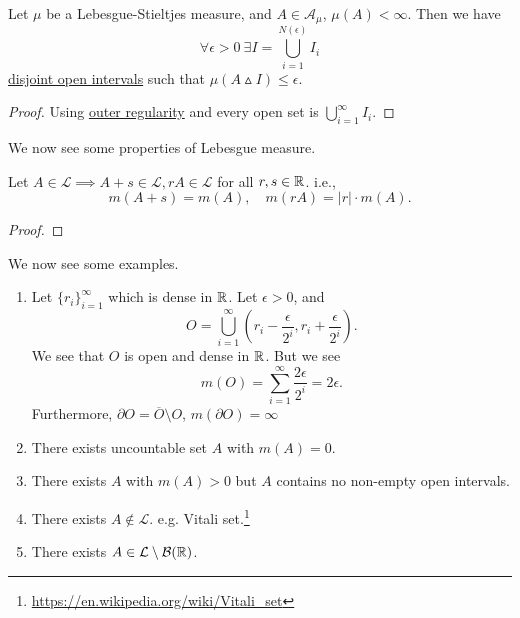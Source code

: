 \begin{proposition}
	Let \(\mu \) be a Lebesgue-Stieltjes measure, and \(A\in \mathcal{A} _\mu \), \(\mu (A)<\infty \). Then we have
	\[
		\forall \epsilon >0\ \exists I = \bigcup\limits_{i=1}^{N(\epsilon )} I_{i}
	\]
	\underline{disjoint open intervals} such that \(\mu (A\vartriangle  I)\leq \epsilon \).
\end{proposition}
\begin{proof}
	Using \hyperref[thm:outer-regularity]{outer regularity} and every open set is \(\bigcup\limits_{i=1}^{\infty} I_{i}\).
\end{proof}

We now see some properties of Lebesgue measure.

\begin{theorem}
	Let \(A\in \mathcal{L} \implies A + s\in \mathcal{L}, rA\in\mathcal{L}  \) for all \(r, s\in\mathbb{\MakeUppercase{r}} \). i.e.,
	\[
		m(A+s) = m(A),\quad m(rA) = \left\vert r \right\vert \cdot m(A).
	\]
\end{theorem}
\begin{proof}
\end{proof}

\begin{eg}
	We now see some examples.
	\begin{enumerate}
		\item Let \(\{r_{i}\}_{i=1}^{\infty}\) which is dense in \(\mathbb{\MakeUppercase{r}} \). Let \(\epsilon >0\), and
		      \[
			      O = \bigcup\limits_{i=1}^{\infty} \left(r_{i} - \frac{\epsilon}{2^i}, r_{i} + \frac{\epsilon}{2^i}\right).
		      \]
		      We see that \(O\) is open and dense in \(\mathbb{\MakeUppercase{r}} \). But we see
		      \[
			      m(O) = \sum\limits_{i=1}^{\infty} \frac{2\epsilon }{2^i} = 2\epsilon.
		      \]
		      Furthermore, \(\partial O = \overline{O} \setminus O\), \(m(\partial O) = \infty \)
		\item There exists uncountable set \(A\) with \(m(A)=0\).
		\item There exists \(A\) with \(m(A)>0\) but \(A\) contains no non-empty open intervals.
		\item There exists \(A\notin \mathcal{L} \). e.g. Vitali set.\footnote{\url{https://en.wikipedia.org/wiki/Vitali_set}}
		\item There exists \(A\in\mathcal{L} \setminus \mathcal{B} (\mathbb{\MakeUppercase{r}} )\).
	\end{enumerate}
\end{eg}